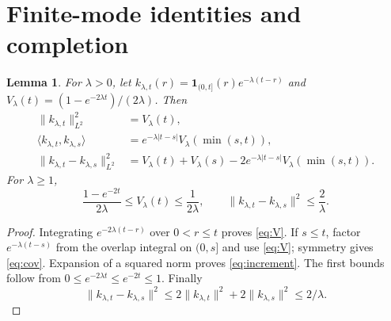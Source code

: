 \documentclass[11pt]{article}
\newtheorem{lemma}[theorem]{Lemma}
\begin{document}
\section{Finite-mode identities and completion}
\begin{lemma}\label{lem:profile}
For $\lambda>0$, let $k_{\lambda,t}(r)=\mathbf1_{(0,t]}(r)
e^{-\lambda(t-r)}$ and
$V_\lambda(t)=(1-e^{-2\lambda t})/(2\lambda)$. Then
\begin{align}
 \|k_{\lambda,t}\|_{L^2}^2&=V_\lambda(t),\label{eq:V}\\
 \langle k_{\lambda,t},k_{\lambda,s}\rangle
 &=e^{-\lambda|t-s|}V_\lambda(\min(s,t)),\label{eq:cov}\\
 \|k_{\lambda,t}-k_{\lambda,s}\|_{L^2}^2
 &=V_\lambda(t)+V_\lambda(s)
       -2e^{-\lambda|t-s|}V_\lambda(\min(s,t)).\label{eq:increment}
\end{align}
For $\lambda\geq1$,
\begin{equation}\label{eq:bounds}
 \frac{1-e^{-2t}}{2\lambda}\leq V_\lambda(t)\leq\frac1{2\lambda},
 \qquad \|k_{\lambda,t}-k_{\lambda,s}\|^2\leq\frac2\lambda.
\end{equation}
\end{lemma}
\begin{proof}
Integrating $e^{-2\lambda(t-r)}$ over $0<r\leq t$ proves
\eqref{eq:V}. If $s\leq t$, factor
$e^{-\lambda(t-s)}$ from the overlap integral on $(0,s]$ and use
\eqref{eq:V}; symmetry gives \eqref{eq:cov}. Expansion of a squared
norm proves \eqref{eq:increment}. The first bounds follow from
$0\leq e^{-2\lambda t}\leq e^{-2t}\leq1$. Finally
\[
 \|k_{\lambda,t}-k_{\lambda,s}\|^2
 \leq2\|k_{\lambda,t}\|^2+2\|k_{\lambda,s}\|^2\leq2/\lambda.
\]
\end{proof}
\end{document}
